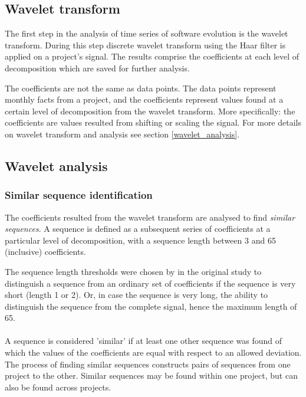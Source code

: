 \subsection{Wavelet transform}
The first step in the analysis of time series of software evolution is the
wavelet transform. During this step discrete wavelet transform using the Haar
filter is applied on a project's signal. The results comprise the
coefficients at each level of decomposition which are saved for further
analysis.

The coefficients are not the same as data points. The data points represent
monthly facts from a project, and the coefficients represent values found at a
certain level of decomposition from the wavelet transform. More specifically:
the coefficients are values resulted from shifting or scaling the signal. For
more details on wavelet transform and analysis see section
\ref{wavelet_analysis}.

\subsection{Wavelet analysis}
\subsubsection{Similar sequence identification}
The coefficients resulted from the wavelet transform are analysed to find
\emph{similar sequences}\rm. A sequence is defined as a subsequent series of
coefficients at a particular level of decomposition, with a sequence length
between 3 and 65 (inclusive) coefficients.

The sequence length thresholds were chosen by \citet{karus2013} in the original
study to distinguish a sequence from an ordinary set of coefficients if the
sequence is very short (length 1 or 2). Or, in case the sequence is very long,
the ability to distinguish the sequence from the complete signal, hence the
maximum length of 65.

\paragraph{}
A sequence is considered 'similar' if at least one other sequence was found of
which the values of the coefficients are equal with respect to an allowed
deviation. The process of finding similar sequences constructs pairs of
sequences from one project to the other. Similar sequences may be found within
one project, but can also be found across projects. 

